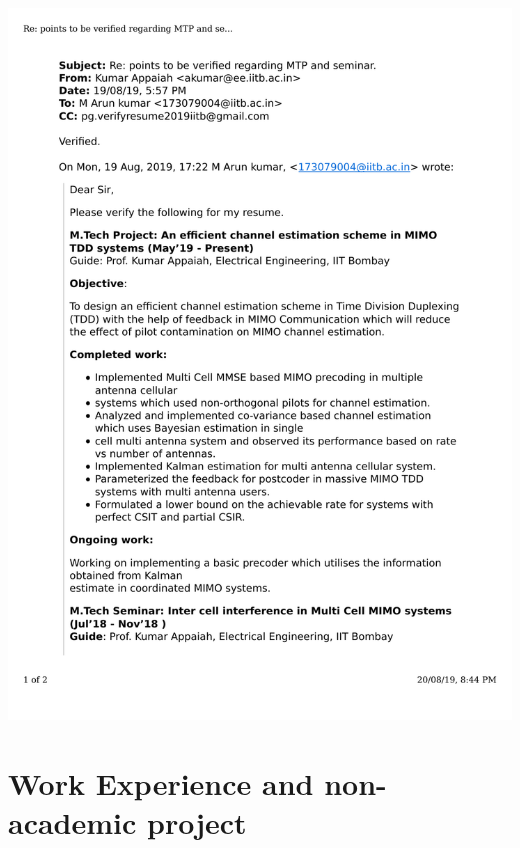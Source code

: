 \documentclass{article}
\begin{document}
	\includegraphics[page=2, scale=0.5]{proofs/mtp.pdf}
\section{Work Experience and non-academic project}
\end{document}
